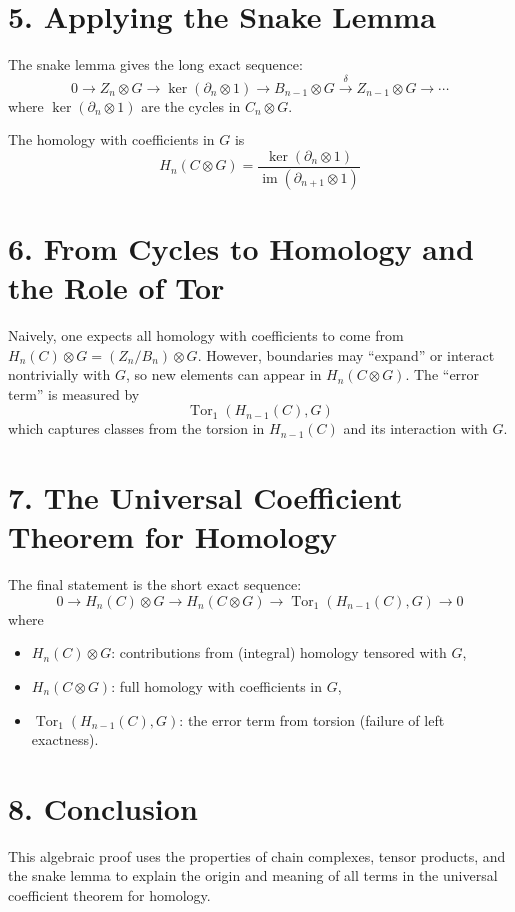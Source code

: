 \documentclass[12pt]{article}
\begin{document}
\section*{5. Applying the Snake Lemma}

The snake lemma gives the long exact sequence:
\[
0 \rightarrow Z_n \otimes G \rightarrow \ker(\partial_n \otimes 1) \rightarrow B_{n-1} \otimes G \xrightarrow{\delta} Z_{n-1} \otimes G \rightarrow \cdots
\]
where \( \ker(\partial_n \otimes 1) \) are the cycles in \( C_n \otimes G \).

The homology with coefficients in \( G \) is
\[
H_n(C \otimes G) = \frac{\ker(\partial_n \otimes 1)}{\operatorname{im}(\partial_{n+1} \otimes 1)}
\]

\section*{6. From Cycles to Homology and the Role of Tor}

Naively, one expects all homology with coefficients to come from \( H_n(C) \otimes G = (Z_n / B_n) \otimes G \).
However, boundaries may ``expand'' or interact nontrivially with \( G \), so new elements can appear in \( H_n(C \otimes G) \).
The ``error term'' is measured by
\[
\operatorname{Tor}_1(H_{n-1}(C), G)
\]
which captures classes from the torsion in \( H_{n-1}(C) \) and its interaction with \( G \).

\section*{7. The Universal Coefficient Theorem for Homology}

The final statement is the short exact sequence:
\[
0 \longrightarrow H_n(C) \otimes G \longrightarrow H_n(C \otimes G) \longrightarrow \operatorname{Tor}_1(H_{n-1}(C), G) \longrightarrow 0
\]
where
\begin{itemize}
    \item \( H_n(C) \otimes G \): contributions from (integral) homology tensored with \( G \),
    \item \( H_n(C \otimes G) \): full homology with coefficients in \( G \),
    \item \( \operatorname{Tor}_1(H_{n-1}(C), G) \): the error term from torsion (failure of left exactness).
\end{itemize}

\section*{8. Conclusion}
This algebraic proof uses the properties of chain complexes, tensor products, and the snake lemma to explain the origin and meaning of all terms in the universal coefficient theorem for homology.
\end{document}
